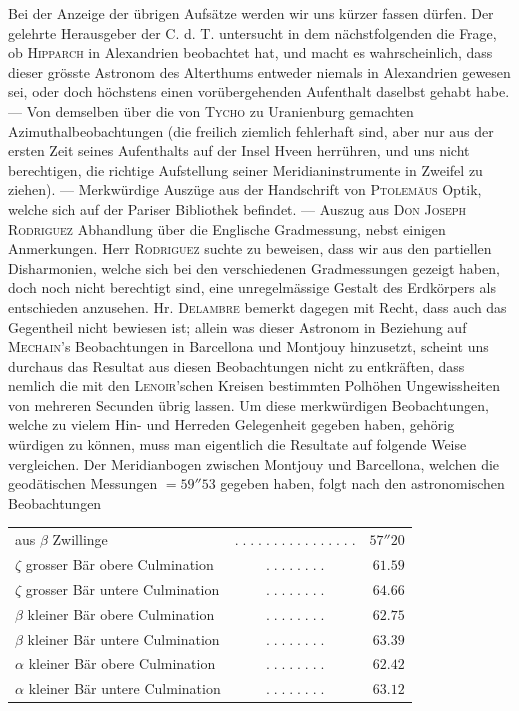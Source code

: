 Bei der Anzeige der übrigen Aufsätze werden wir uns kürzer fassen dürfen. Der gelehrte Herausgeber der C. d. T. untersucht in dem nächstfolgenden die Frage, ob \textsc{Hipparch} in Alexandrien beobachtet hat, und macht es wahrscheinlich, dass dieser grösste Astronom des Alterthums entweder niemals in Alexandrien gewesen sei, oder doch höchstens einen vorübergehenden Aufenthalt daselbst gehabt habe. --- Von demselben über die von \textsc{Tycho} zu Uranienburg gemachten Azimuthalbeobachtungen (die freilich ziemlich fehlerhaft sind, aber nur aus der ersten Zeit seines Aufenthalts auf der Insel Hveen herrühren, und uns nicht berechtigen, die richtige Aufstellung seiner Meridianinstrumente in Zweifel zu ziehen). --- Merkwürdige Auszüge aus der Handschrift von \textsc{Ptolemäus} Optik, welche sich auf der Pariser Bibliothek befindet. --- Auszug aus \textsc{Don Joseph Rodriguez} Abhandlung über die Englische Gradmessung, nebst einigen Anmerkungen. Herr \textsc{Rodriguez} suchte zu beweisen, dass wir aus den partiellen Disharmonien, welche sich bei den verschiedenen Gradmessungen gezeigt haben, doch noch nicht berechtigt sind, eine unregelmässige Gestalt des Erdkörpers als entschieden anzusehen. Hr. \textsc{Delambre} bemerkt dagegen mit Recht, dass auch das Gegentheil nicht bewiesen ist; allein was dieser Astronom in Beziehung auf \textsc{Mechain}'s Beobachtungen in Barcellona und Montjouy hinzusetzt, scheint uns durchaus das Resultat aus diesen Beobachtungen nicht zu entkräften, dass nemlich die mit den \textsc{Lenoir}'schen Kreisen bestimmten Polhöhen Ungewissheiten von mehreren Secunden übrig lassen. Um diese merkwürdigen Beobachtungen, welche zu vielem Hin- und Herreden Gelegenheit gegeben haben, gehörig würdigen zu können, muss man eigentlich die Resultate auf folgende Weise vergleichen. Der Meridianbogen zwischen Montjouy und Barcellona, welchen die geodätischen Messungen $=59''53$ gegeben haben, folgt nach den astronomischen Beobachtungen
\begin{center}
\fontsize{9}{11}\selectfont\setlength{\tabcolsep}{3pt}\begin{tabular}{@{}l c r@{}}
aus $\beta$ Zwillinge & $.\;.\;.\;.\;.\;.\;.\;.\;.\;.\;.\;.\;.\;.\;.\;.$ & $57''20$\\
$\zeta$ grosser Bär obere Culmination & $.\;.\;.\;.\;.\;.\;.\;.$ & $61.59$\\
$\zeta$ grosser Bär untere Culmination & $.\;.\;.\;.\;.\;.\;.\;.$ & $64.66$\\
$\beta$ kleiner Bär obere Culmination & $.\;.\;.\;.\;.\;.\;.\;.$ & $62.75$\\
$\beta$ kleiner Bär untere Culmination & $.\;.\;.\;.\;.\;.\;.\;.$ & $63.39$\\
$\alpha$ kleiner Bär obere Culmination & $.\;.\;.\;.\;.\;.\;.\;.$ & $62.42$\\
$\alpha$ kleiner Bär untere Culmination & $.\;.\;.\;.\;.\;.\;.\;.$ & $63.12$\\
\end{tabular}
\end{center}
